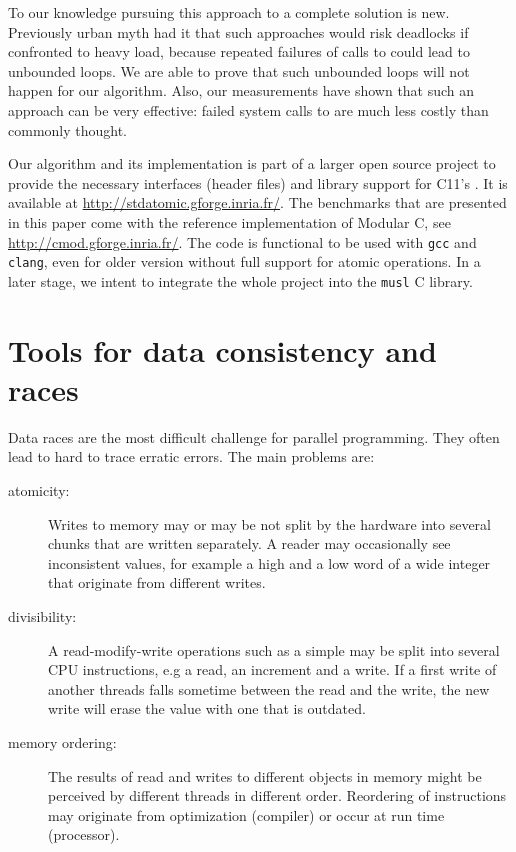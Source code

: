 To our knowledge pursuing this approach to a complete solution is
new. Previously urban myth had it that such approaches would risk
deadlocks if confronted to heavy load, because repeated failures of
calls to  could lead to unbounded loops. We are able to
prove that such unbounded loops will not happen for our algorithm.
Also, our measurements have shown that such an approach can be very
effective: failed system calls to  are much less costly
than commonly thought.

Our algorithm and its implementation is part of a larger open source
project to provide the necessary interfaces (header files) and library
support for C11's . It is available at
\url{http://stdatomic.gforge.inria.fr/}. The benchmarks that are presented
in this paper come with the reference implementation of Modular C, see
\url{http://cmod.gforge.inria.fr/}.  The code is functional to be used with
\texttt{gcc} and \texttt{clang}, even for older version without full
support for atomic operations.  In a later stage, we intent to integrate
the whole project into the \texttt{musl} C library.
\clearpage

\section{Tools for data consistency and races}
\label{sec-2}

Data races are the most difficult challenge for parallel
programming. They often lead to hard to trace erratic errors.
The main problems are:\itemadjust

\begin{description}
\item[{atomicity:}] Writes to memory may or may be not split by the
hardware into several chunks that are written
separately. A reader may occasionally see
inconsistent values, for example a high and a low
word of a wide integer that originate from different
writes.\itemadjust
\item[{divisibility:}] A read-modify-write operations such as a simple
 may be split into several CPU instructions,
e.g a read, an increment and a write. If a first
write of another threads falls sometime between
the read and the write, the new write will erase
the value with one that is outdated.\itemadjust
\item[{memory ordering:}] The results of read and writes to different
objects in memory might be perceived by different threads in
different order. Reordering of instructions may originate from
optimization (compiler) or occur at run time (processor).
\end{description}

